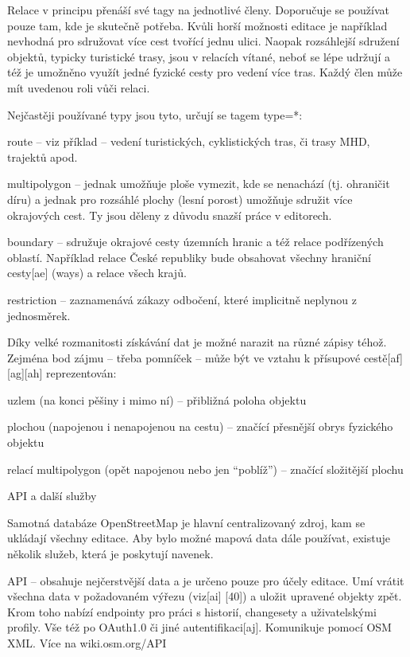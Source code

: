 Relace v principu přenáší své tagy na jednotlivé členy. Doporučuje se používat pouze tam, kde je skutečně potřeba. Kvůli horší možnosti editace je například nevhodná pro sdružovat více cest tvořící jednu ulici. Naopak rozsáhlejší sdružení objektů, typicky turistické trasy, jsou v relacích vítané, neboť se lépe udržují a též je umožněno využít jedné fyzické cesty pro vedení více tras. Každý člen může mít uvedenou roli vůči relaci.

Nejčastěji používané typy jsou tyto, určují se tagem type=*:

route – viz příklad – vedení turistických, cyklistických tras, či trasy MHD, trajektů apod.

multipolygon – jednak umožňuje ploše vymezit, kde se nenachází (tj. ohraničit díru) a jednak pro rozsáhlé plochy (lesní porost) umožňuje sdružit více okrajových cest. Ty jsou děleny z důvodu snazší práce v editorech.

boundary – sdružuje okrajové cesty územních hranic a též relace podřízených oblastí. Například relace České republiky bude obsahovat všechny hraniční cesty[ae] (ways) a relace všech krajů.

restriction – zaznamenává zákazy odbočení, které implicitně neplynou z jednosměrek.

Díky velké rozmanitosti získávání dat je možné narazit na různé zápisy téhož. Zejména bod zájmu – třeba pomníček – může být ve vztahu k přísupové cestě[af][ag][ah] reprezentován:

uzlem (na konci pěšiny i mimo ní) – přibližná poloha objektu

plochou (napojenou i nenapojenou na cestu) – značící přesnější obrys fyzického objektu

relací multipolygon (opět napojenou nebo jen “poblíž”) – značící složitější plochu

API a další služby



Samotná databáze OpenStreetMap je hlavní centralizovaný zdroj, kam se ukládají všechny editace. Aby bylo možné mapová data dále používat, existuje několik služeb, která je poskytují navenek.

API – obsahuje nejčerstvější data a je určeno pouze pro účely editace. Umí vrátit všechna data v požadovaném výřezu (viz[ai] [40]) a uložit upravené objekty zpět. Krom toho nabízí endpointy pro práci s historií, changesety a uživatelskými profily. Vše též po OAuth1.0 či jiné autentifikaci[aj]. Komunikuje pomocí OSM XML. Více na wiki.osm.org/API

